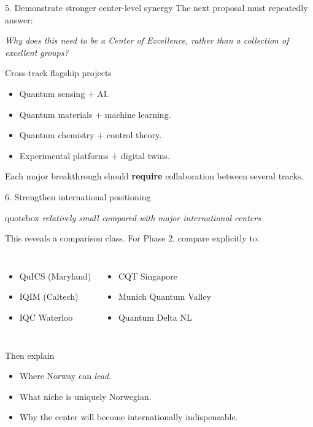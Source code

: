 \documentclass[10pt,aspectratio=169]{beamer}
\newcommand{\reviewerquote}[1]{%
  \begin{beamercolorbox}[sep=6pt,rounded=true,shadow=true]{quotebox}%
  \itshape #1%
  \end{beamercolorbox}%
}
\begin{document}
\begin{frame}{5. Demonstrate stronger center-level synergy}
  The next proposal must repeatedly answer:
  \begin{center}
    \large \emph{Why does this need to be a Center of Excellence, rather than a collection of excellent groups?}
  \end{center}
  \vfill
  \begin{block}{Cross-track flagship projects}
    \begin{itemize}
      \item Quantum sensing $+$ AI.
      \item Quantum materials $+$ machine learning.
      \item Quantum chemistry $+$ control theory.
      \item Experimental platforms $+$ digital twins.
    \end{itemize}
  \end{block}
  \vfill
  \begin{center}
    Each major breakthrough should \textbf{require} collaboration between several tracks.
  \end{center}
\end{frame}

\begin{frame}{6. Strengthen international positioning}
  \reviewerquote{relatively small compared with major international centers}
  \vfill
  This reveals a comparison class. For Phase 2, compare explicitly to:
  \vfill
  \begin{columns}[T]
    \begin{itemize}
      \item QuICS (Maryland)
      \item IQIM (Caltech)
      \item IQC Waterloo
    \end{itemize}

    \begin{itemize}
      \item CQT Singapore
      \item Munich Quantum Valley
      \item Quantum Delta NL
    \end{itemize}
  \end{columns}
  \vfill
  \begin{block}{Then explain}
    \begin{itemize}
      \item Where Norway can \emph{lead}.
      \item What niche is uniquely Norwegian.
      \item Why the center will become internationally indispensable.
    \end{itemize}
  \end{block}
\end{frame}
\end{document}
